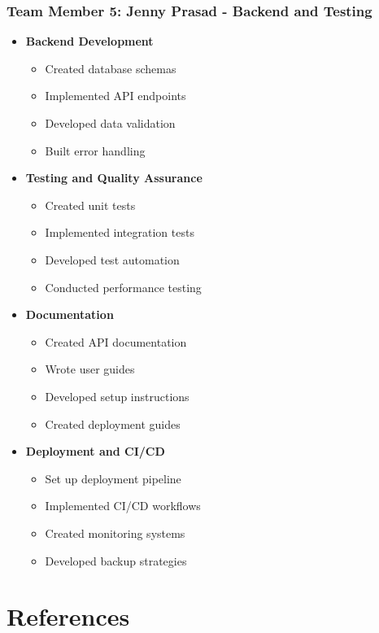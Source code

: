 \documentclass[12pt,a4paper]{report}
\begin{document}
\subsection{Team Member 5: Jenny Prasad - Backend and Testing}
\begin{itemize}
    \item \textbf{Backend Development}
    \begin{itemize}
        \item Created database schemas
        \item Implemented API endpoints
        \item Developed data validation
        \item Built error handling
    \end{itemize}
    
    \item \textbf{Testing and Quality Assurance}
    \begin{itemize}
        \item Created unit tests
        \item Implemented integration tests
        \item Developed test automation
        \item Conducted performance testing
    \end{itemize}
    
    \item \textbf{Documentation}
    \begin{itemize}
        \item Created API documentation
        \item Wrote user guides
        \item Developed setup instructions
        \item Created deployment guides
    \end{itemize}
    
    \item \textbf{Deployment and CI/CD}
    \begin{itemize}
        \item Set up deployment pipeline
        \item Implemented CI/CD workflows
        \item Created monitoring systems
        \item Developed backup strategies
    \end{itemize}
\end{itemize}

\chapter{References}
\end{document}
